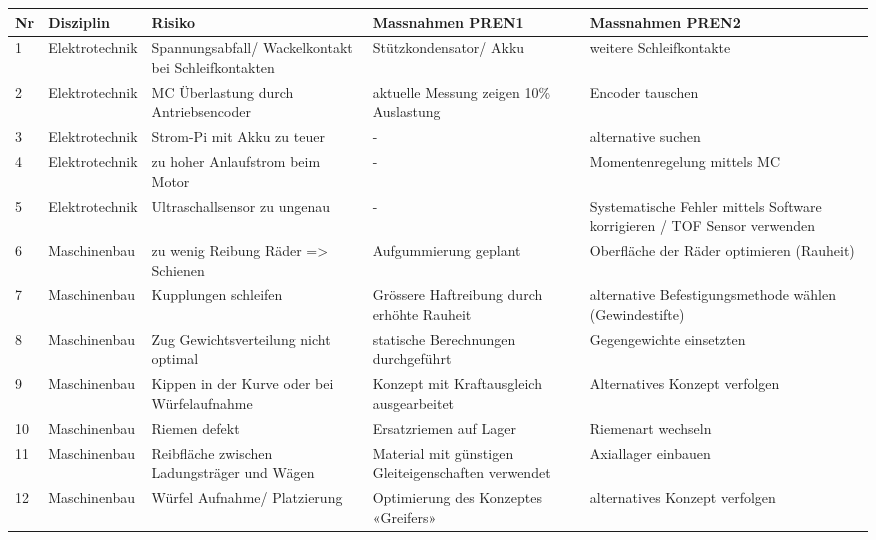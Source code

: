 \documentclass[../../main.tex]{subfiles}
\begin{document}
    \begin{longtable}{|l|p{2.5cm}|p{3cm}|p{3.8cm}|p{3.8cm}|}
    \hline
    \textbf{Nr} & \textbf{Disziplin} & \textbf{Risiko} & \textbf{Massnahmen PREN1} & \textbf{Massnahmen PREN2} \\ \hline
    1    &  Elektrotechnik    & Spannungsabfall/ Wackelkontakt bei Schleifkontakten & Stützkondensator/ Akku & weitere Schleifkontakte \\ \hline
    2    &  Elektrotechnik    & MC Überlastung durch Antriebsencoder                & aktuelle Messung zeigen 10\% Auslastung & Encoder tauschen \\ \hline
    3    & Elektrotechnik    & Strom-Pi mit Akku zu teuer                           & -  & alternative suchen \\ \hline
    4    & Elektrotechnik    & zu hoher Anlaufstrom beim Motor                      & -  & Momentenregelung mittels MC \\ \hline
    5    & Elektrotechnik    & Ultraschallsensor zu ungenau                         & - & Systematische Fehler mittels Software korrigieren / TOF Sensor verwenden \\ \hline
    6    & Maschinenbau      & zu wenig Reibung Räder => Schienen                   & Aufgummierung geplant & Oberfläche der Räder optimieren (Rauheit) \\ \hline
    7    & Maschinenbau     & Kupplungen schleifen                                  & Grössere Haftreibung durch erhöhte Rauheit & alternative Befestigungsmethode wählen (Gewindestifte) \\ \hline
    8    & Maschinenbau & Zug Gewichtsverteilung nicht optimal                      & statische Berechnungen durchgeführt & Gegengewichte einsetzten \\ \hline
    9   & Maschinenbau  & Kippen in der Kurve oder bei Würfelaufnahme               & Konzept mit Kraftausgleich ausgearbeitet & Alternatives Konzept verfolgen \\ \hline
    10  & Maschinenbau & Riemen defekt                                              & Ersatzriemen auf Lager            & Riemenart wechseln \\ \hline
    11  & Maschinenbau & Reibfläche zwischen Ladungsträger und Wägen                & Material mit günstigen Gleiteigenschaften verwendet & Axiallager einbauen \\ \hline
    12  & Maschinenbau & Würfel Aufnahme/ Platzierung                               & Optimierung des Konzeptes «Greifers» & alternatives Konzept verfolgen \\ \hline

\end{longtable}
\end{document}
